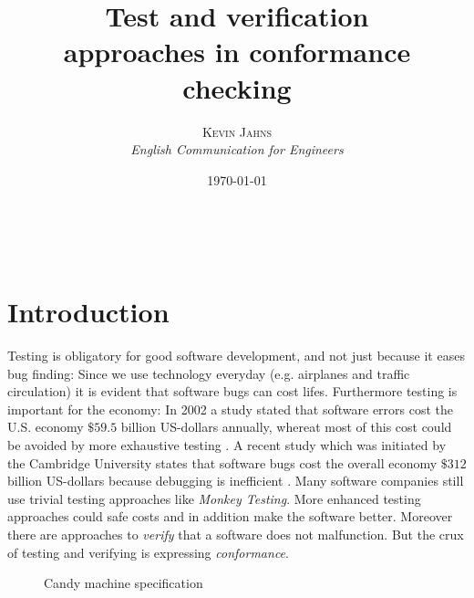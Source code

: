 \documentclass{article}
\title{\textbf{Test and verification}\\ %
approaches in conformance checking} %
\author{\textsc{Kevin Jahns} %
\\{\textit{English Communication for Engineers}}} %
\date{\today} %
\makeatletter
\renewcommand{\maketitle}{ %
\begin{flushright} %
{\LARGE\@title} %

\vspace{50pt} %

{\large\@author} %
\\\@date %

\vspace{40pt} %
\end{flushright}
}
\makeatother
\begin{document}
\maketitle %


\section*{Introduction}
Testing is obligatory for good software development, and not just because it
eases bug finding: Since we use technology everyday (e.g. airplanes and traffic
circulation) it is evident that software bugs can cost lifes. Furthermore
testing is important for the economy: In 2002 a study stated that software errors cost the U.S.
economy $ \$59.5$ billion US-dollars annually, whereat most of this cost could
be avoided by more exhaustive testing \cite{nist}. A recent study which was
initiated by the Cambridge University states that software bugs cost the 
overall economy $ \$ 312 $  billion US-dollars because debugging is inefficient
\cite{cambridge_errors}.
Many software companies still use trivial testing approaches like
\textit{Monkey Testing}. More enhanced testing approaches could safe costs and 
in addition make the software better. Moreover there are approaches to
\textit{verify} that a software does not malfunction. But the crux of testing
and verifying is expressing \textit{conformance}. 

\begin{wrapfigure}{r}{0.4\textwidth} %
\caption{Candy machine specification}
\label{candymachine}
\begin{center}
\end{center}
\end{wrapfigure}
\end{document}

